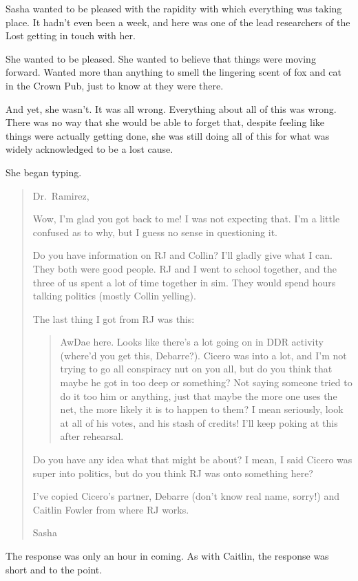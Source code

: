 Sasha wanted to be pleased with the rapidity with which everything was taking place. It hadn't even been a week, and here was one of the lead researchers of the Lost getting in touch with her.

She wanted to be pleased. She wanted to believe that things were moving forward. Wanted more than anything to smell the lingering scent of fox and cat in the Crown Pub, just to know at they were there.

And yet, she wasn't. It was all wrong. Everything about all of this was wrong. There was no way that she would be able to forget that, despite feeling like things were actually getting done, she was still doing all of this for what was widely acknowledged to be a lost cause.

She began typing.

\begin{quote}
Dr.~Ramirez,

Wow, I'm glad you got back to me! I was not expecting that. I'm a little confused as to why, but I guess no sense in questioning it.

Do you have information on RJ and Collin? I'll gladly give what I can. They both were good people. RJ and I went to school together, and the three of us spent a lot of time together in sim. They would spend hours talking politics (mostly Collin yelling).

The last thing I got from RJ was this:

\begin{quote}
AwDae here. Looks like there's a lot going on in DDR activity (where'd you get this, Debarre?). Cicero was into a lot, and I'm not trying to go all conspiracy nut on you all, but do you think that maybe he got in too deep or something? Not saying someone tried to do it too him or anything, just that maybe the more one uses the net, the more likely it is to happen to them? I mean seriously, look at all of his votes, and his stash of credits! I'll keep poking at this after rehearsal.
\end{quote}

Do you have any idea what that might be about? I mean, I said Cicero was super into politics, but do you think RJ was onto something here?

I've copied Cicero's partner, Debarre (don't know real name, sorry!) and Caitlin Fowler from where RJ works.

Sasha
\end{quote}

The response was only an hour in coming. As with Caitlin, the response was short and to the point.

